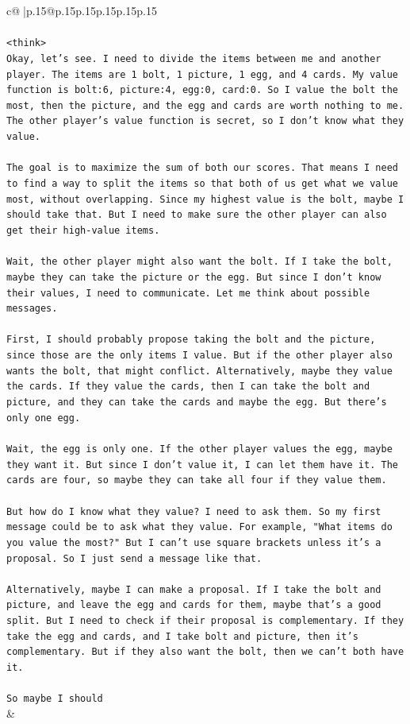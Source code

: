 \documentclass{article}
\begin{document}
{\begin{supertabular}{c@{$\;$}|p{.15\linewidth}@{}p{.15\linewidth}p{.15\linewidth}p{.15\linewidth}p{.15\linewidth}p{.15\linewidth}}
{{{\\ 
\\ 
\texttt{<think>} \\
\texttt{Okay, let's see. I need to divide the items between me and another player. The items are 1 bolt, 1 picture, 1 egg, and 4 cards. My value function is bolt:6, picture:4, egg:0, card:0. So I value the bolt the most, then the picture, and the egg and cards are worth nothing to me. The other player's value function is secret, so I don't know what they value. } \\
\\ 
\texttt{The goal is to maximize the sum of both our scores. That means I need to find a way to split the items so that both of us get what we value most, without overlapping. Since my highest value is the bolt, maybe I should take that. But I need to make sure the other player can also get their high{-}value items. } \\
\\ 
\texttt{Wait, the other player might also want the bolt. If I take the bolt, maybe they can take the picture or the egg. But since I don't know their values, I need to communicate. Let me think about possible messages. } \\
\\ 
\texttt{First, I should probably propose taking the bolt and the picture, since those are the only items I value. But if the other player also wants the bolt, that might conflict. Alternatively, maybe they value the cards. If they value the cards, then I can take the bolt and picture, and they can take the cards and maybe the egg. But there's only one egg. } \\
\\ 
\texttt{Wait, the egg is only one. If the other player values the egg, maybe they want it. But since I don't value it, I can let them have it. The cards are four, so maybe they can take all four if they value them. } \\
\\ 
\texttt{But how do I know what they value? I need to ask them. So my first message could be to ask what they value. For example, "What items do you value the most?" But I can't use square brackets unless it's a proposal. So I just send a message like that. } \\
\\ 
\texttt{Alternatively, maybe I can make a proposal. If I take the bolt and picture, and leave the egg and cards for them, maybe that's a good split. But I need to check if their proposal is complementary. If they take the egg and cards, and I take bolt and picture, then it's complementary. But if they also want the bolt, then we can't both have it. } \\
\\ 
\texttt{So maybe I should} \\
            }
        }
    }
    & \\ \\


\end{supertabular}}
\end{document}
